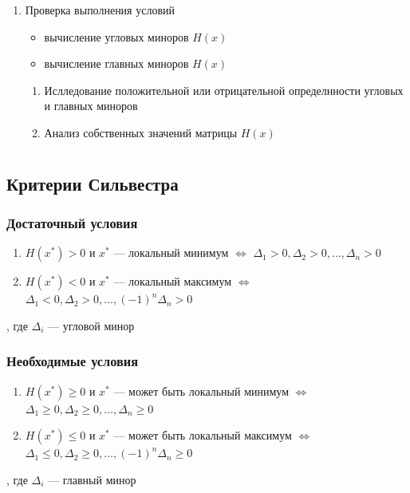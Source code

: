 \documentclass[oneside]{book}
\theoremstyle{plain}
\theoremstyle{remark}
\theoremstyle{definition}
\begin{document}
\begin{enumerate}
\item Проверка выполнения условий
\label{sec:org043eab9}
\begin{itemize}
\item вычисление угловых миноров \(H(x)\)
\item вычисление главных миноров \(H(x)\) \\
\end{itemize}


\begin{enumerate}
\item Ислледование положительной или отрицательной определнности угловых и главных миноров
\item Анализ собственных значений матрицы \(H(x)\)
\end{enumerate}
\end{enumerate}
\chapter{}
\label{sec:org7a594a6}
\newcommand{\diff}[2]{\frac{\partial #1}{\partial #2}}


\section{Критерии Сильвестра}
\label{sec:org6467719}
\subsection{Достаточный условия}
\label{sec:org3385123}
\begin{enumerate}
\item \(H(x^*) > 0\) и \(x^*\) --- локальный минимум \(\Leftrightarrow\) \(\Delta_1 > 0, \Delta_2 > 0, \dots , \Delta_n > 0\)
\item \(H(x^*) < 0\) и \(x^*\) --- локальный максимум \(\Leftrightarrow\) \(\Delta_1 < 0, \Delta_2 > 0, \dots , (-1)^n\Delta_n > 0\)
\end{enumerate}
, где \(\Delta_i\) --- угловой минор
\subsection{Необходимые условия}
\label{sec:org81dfd0e}
\begin{enumerate}
\item \(H(x^*) \ge 0\) и \(x^*\) --- может быть локальный минимум \(\Leftrightarrow\) \(\Delta_1 \ge 0, \Delta_2 \ge 0, \dots, \Delta_n \ge 0\)
\item \(H(x^*) \le 0\) и \(x^*\) --- может быть локальный максимум \(\Leftrightarrow\) \(\Delta_1 \le 0, \Delta_2 \ge 0, \dots, (-1)^n\Delta_n \ge 0\)
\end{enumerate}
, где \(\Delta_i\) --- главный минор
\end{document}
